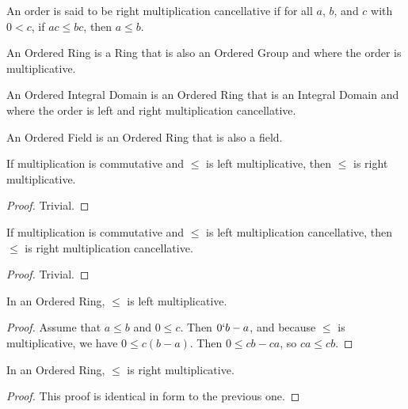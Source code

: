 \documentclass[../math.tex]{subfiles}
\begin{document}
\begin{class}
    An order is said to be right multiplication cancellative if for all $a$,
    $b$, and $c$ with $0 < c$, if $ac \leq bc$, then $a \leq b$.
\end{class}

\begin{class}
    An Ordered Ring is a Ring that is also an Ordered Group and where the order
    is multiplicative.
\end{class}

\begin{class}
    An Ordered Integral Domain is an Ordered Ring that is an Integral Domain and
    where the order is left and right multiplication cancellative.
\end{class}

\begin{class}
    An Ordered Field is an Ordered Ring that is also a field.
\end{class}

\begin{instance}
    If multiplication is commutative and $\leq$ is left multiplicative, then
    $\leq$ is right multiplicative.
\end{instance}
\begin{proof}
    Trivial.
\end{proof}

\begin{instance}
    If multiplication is commutative and $\leq$ is left multiplication
    cancellative, then $\leq$ is right multiplication cancellative.
\end{instance}
\begin{proof}
    Trivial.
\end{proof}

\begin{instance}
    In an Ordered Ring, $\leq$ is left multiplicative.
\end{instance}
\begin{proof}
    Assume that $a \leq b$ and $0 \leq c$.  Then $0 \lq b - a$, and because
    $\leq$ is multiplicative, we have $0 \leq c(b - a)$.  Then $0 \leq cb - ca$,
    so $ca \leq cb$.
\end{proof}

\begin{instance}
    In an Ordered Ring, $\leq$ is right multiplicative.
\end{instance}
\begin{proof}
    This proof is identical in form to the previous one.
\end{proof}
\end{document}
